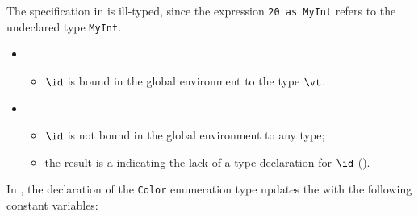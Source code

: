 The specification in  is ill-typed,
since the expression \verb|20 as MyInt| refers to the undeclared type \verb|MyInt|.

\ProseParagraph
\OneApplies
\begin{itemize}
  \item {}
  \begin{itemize}
    \item $\id$ is bound in the global environment to the type $\vt$.
  \end{itemize}

  \item {}
  \begin{itemize}
    \item $\id$ is not bound in the global environment to any type;
    \item the result is a \typingerrorterm{} indicating the lack of a type declaration for $\id$ (\UndefinedIdentifier).
  \end{itemize}
\end{itemize}

\FormallyParagraph
\begin{mathpar}
\end{mathpar}

\begin{mathpar}
\end{mathpar}



In , the declaration of the \verb|Color| enumeration type
updates the \staticenvironmentterm{} with the following constant variables:

